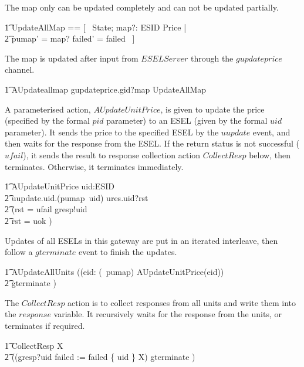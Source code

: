 The map only can be updated completely and can not be updated partially.
\begin{zed}
        \t1 UpdateAllMap == [~ \Delta State; map?: ESID \pfun Price | \\
            \t2 pumap' = map? \land failed' = failed ~] 
\end{zed}

The map is updated after input from $ESELServer$ through the $gupdateprice$ channel.
\begin{circusaction}
        \t1 AUpdateallmap \circdef gupdateprice.gid?map \then \lschexpract UpdateAllMap \rschexpract \\
\end{circusaction}

A parameterised action, $AUpdateUnitPrice$, is given to update the price (specified by the formal $pid$ parameter) to an ESEL (given by the formal $uid$ parameter). It sends the price to the specified ESEL by the $uupdate$ event, and then waits for the response from the ESEL. If the return status is not successful ($ufail$), it sends the result to response collection action $CollectResp$ below, then terminates. Otherwise, it terminates immediately.
\begin{circusaction}
        \t1 AUpdateUnitPrice \circdef uid:ESID \circspot \\
            \t2 uupdate.uid.(pumap~uid) \then ures.uid?rst \then \\
            \t2 (\lcircguard rst = ufail \rcircguard \circguard gresp!uid \then \Skip \\
            \t2 \extchoice \lcircguard rst = uok \rcircguard \circguard \Skip)\\
\end{circusaction}

Updates of all ESELs in this gateway are put in an iterated interleave, then follow a $gterminate$ event to finish the updates.
\begin{circusaction}
        \t1 AUpdateAllUnits \circdef ((\Interleave eid: (\dom~pumap) \linter \emptyset \rinter \circspot AUpdateUnitPrice(eid)) \\
        \t2 \circseq gterminate \then \Skip) \\
\end{circusaction}

The $CollectResp$ action is to collect responses from all units and write them into the $response$ variable. It recursively waits for the response from the units, or terminates if required.
\begin{circusaction}
        \t1 CollectResp \circdef \circmu X \circspot \\
            \t2 ((gresp?uid \then failed := failed \cup \{ uid \} \circseq X) \extchoice gterminate \then \Skip) \\
\end{circusaction}

